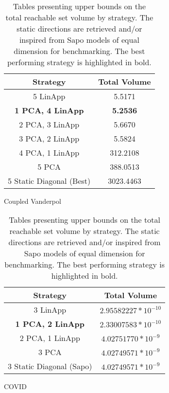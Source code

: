 \begin{table}[h!]
    \hspace{1em}
    \begin{subtable}[h]{0.45\textwidth}
         \centering
         \begin{tabular}{|c|c|}
         \hline
         Strategy & Total  Volume \\
         \hline
         5 LinApp & 5.5171 \\
         \hline
         {\bf 1 PCA, 4 LinApp } & {\bf 5.2536} \\
         \hline
         2 PCA, 3 LinApp  & 5.6670\\
         \hline
         3 PCA, 2 LinApp  & 5.5824\\
         \hline
         4 PCA, 1 LinApp  & 312.2108 \\
         \hline
         5 PCA  & 388.0513 \\
         \hline
         5 Static Diagonal (Best) & 3023.4463  \\
         \hline
        \end{tabular}
        \caption{Coupled Vanderpol}
        \label{tab:sirvol}
     \end{subtable}\hspace{1 em}
    \begin{subtable}[h]{0.45\textwidth}
         \centering
         \begin{tabular}{|c|c|}
         \hline
         Strategy & Total  Volume \\
         \hline
         3 LinApp & $2.95582227 * 10^{-10}$ \\
         \hline
         {\bf 1 PCA, 2 LinApp } & {\bf $2.33007583 * 10^{-10}$}\\
         \hline
         2 PCA, 1 LinApp &$ 4.02751770 * 10^{-9}$\\
         \hline
         3 PCA & $4.02749571 * 10^{-9}$\\
         \hline
         3 Static Diagonal (Sapo) & $4.02749571 * 10^{-9}$\\
         \hline
        \end{tabular}
        \caption{COVID}
        \label{tab:covidvol}
     \end{subtable}
 \caption{Tables presenting upper bounds on the total reachable set volume by strategy. The static directions are retrieved and/or inspired from Sapo models of equal dimension for benchmarking. The best performing strategy is highlighted in bold.}
     \label{tab:voltable}
\end{table}
